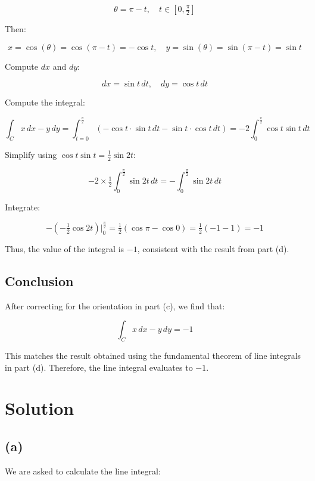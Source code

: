 \documentclass[11pt]{article}
\begin{document}
\[
\theta = \pi - t, \quad t \in [0, \tfrac{\pi}{2}]
\]

Then:

\[
x = \cos(\theta) = \cos(\pi - t) = -\cos t, \quad y = \sin(\theta) = \sin(\pi - t) = \sin t
\]

Compute $dx$ and $dy$:

\[
dx = \sin t \, dt, \quad dy = \cos t \, dt
\]

Compute the integral:

\[
\int_C x \, dx - y \, dy = \int_{t=0}^{\tfrac{\pi}{2}} \left( -\cos t \cdot \sin t \, dt - \sin t \cdot \cos t \, dt \right) = -2 \int_{0}^{\tfrac{\pi}{2}} \cos t \sin t \, dt
\]

Simplify using $\cos t \sin t = \tfrac{1}{2} \sin 2t$:

\[
-2 \times \tfrac{1}{2} \int_{0}^{\tfrac{\pi}{2}} \sin 2t \, dt = -\int_{0}^{\tfrac{\pi}{2}} \sin 2t \, dt
\]

Integrate:

\[
-\left( -\tfrac{1}{2} \cos 2t \right) \Big|_{0}^{\tfrac{\pi}{2}} = \tfrac{1}{2} \left( \cos \pi - \cos 0 \right) = \tfrac{1}{2} \left( -1 - 1 \right) = -1
\]

Thus, the value of the integral is $\boxed{-1}$, consistent with the result from part (d).

\newpage

\subsection{Conclusion}

After correcting for the orientation in part (c), we find that:

\[
\int_C x \, dx - y \, dy = -1
\]

This matches the result obtained using the fundamental theorem of line integrals in part (d). Therefore, the line integral evaluates to $-1$.




\newpage

\section{Solution}

\newpage

\subsection{(a)}

We are asked to calculate the line integral:
\end{document}
